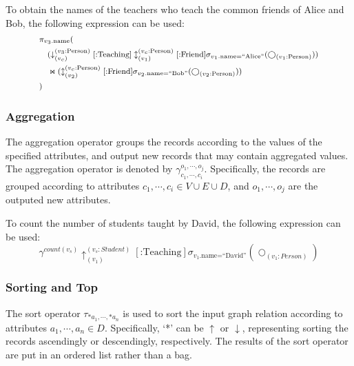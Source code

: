 \begin{example}
    To obtain the names of the teachers who teach the common friends of Alice and Bob, the following expression can be used:
    \begin{equation*}
        \footnotesize
        \begin{split}
            & \pi_{v_3\text{.name}}( \\
            & \hspace{1em} (\downarrow_{(v_c)}^{(v_3\text{:Person})}[\text{:Teaching}]\updownarrow_{(v_1)}^{(v_c\text{:Person})}[\text{:Friend}]\sigma_{v_1\text{.name=``Alice''}}(\bigcirc_{(v_1\text{:Person})})) \\
            & \hspace{1em} \Join (\updownarrow_{(v_2)}^{(v_c\text{:Person})}[\text{:Friend}]\sigma_{v_2\text{.name=``Bob''}}(\bigcirc_{(v_2\text{:Person})}))\\
            & )
        \end{split}
    \end{equation*}
\end{example}

\subsubsection{Aggregation}
The aggregation operator groups the records according to the values of the specified attributes, and output new records that may contain aggregated values.
The aggregation operator is denoted by $\gamma_{c_1, \cdots, c_i}^{o_1, \cdots, o_j}$.
Specifically, the records are grouped according to attributes $c_1, \cdots, c_i \in V \cup E \cup D$, and $o_1, \cdots, o_j$ are the outputed new attributes.

\begin{example}
    To count the number of students taught by David, the following expression can be used:
    \begin{equation*}
        \gamma_{}^{count(v_s)}\uparrow_{(v_1)}^{(v_s:Student)}[\text{:Teaching}]\sigma_{v_1\text{.name=``David''}}(\bigcirc_{(v_1:Person)})
    \end{equation*}
\end{example}

\subsubsection{Sorting and Top}

The sort operator $\tau_{* a_1, \cdots, * a_n}$ is used to sort the input graph relation according to attributes $a_1, \cdots, a_n \in D$.
Specifically, `*' can be $\uparrow$ or $\downarrow$, representing sorting the records ascendingly or descendingly, respectively.
The results of the sort operator are put in an ordered list rather than a bag.

